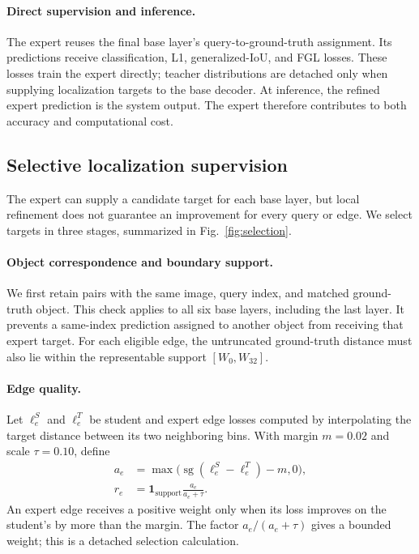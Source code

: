 \paragraph{Direct supervision and inference.}
The expert reuses the final base layer's query-to-ground-truth assignment. Its predictions receive classification, L1, generalized-IoU, and FGL losses. These losses train the expert directly; teacher distributions are detached only when supplying localization targets to the base decoder. At inference, the refined expert prediction is the system output. The expert therefore contributes to both accuracy and computational cost.

\subsection{Selective localization supervision}
The expert can supply a candidate target for each base layer, but local refinement does not guarantee an improvement for every query or edge. We select targets in three stages, summarized in Fig.~\ref{fig:selection}.


\paragraph{Object correspondence and boundary support.}
We first retain pairs with the same image, query index, and matched ground-truth object. This check applies to all six base layers, including the last layer. It prevents a same-index prediction assigned to another object from receiving that expert target. For each eligible edge, the untruncated ground-truth distance must also lie within the representable support $[W_0,W_{32}]$.

\paragraph{Edge quality.}
Let $\ell^S_e$ and $\ell^T_e$ be student and expert edge losses computed by interpolating the target distance between its two neighboring bins. With margin $m=0.02$ and scale $\tau=0.10$, define
\begin{equation}
\begin{aligned}
a_e&=\max\bigl(\operatorname{sg}(\ell^S_e-\ell^T_e)-m,0\bigr),\\
r_e&=\mathbf{1}_{\mathrm{support}}\frac{a_e}{a_e+\tau}.
\end{aligned}
\label{eq:edgeweight}
\end{equation}
An expert edge receives a positive weight only when its loss improves on the student's by more than the margin. The factor $a_e/(a_e+\tau)$ gives a bounded weight; this is a detached selection calculation.

